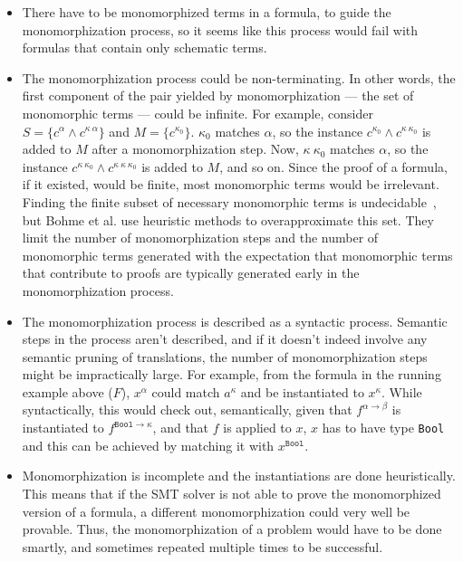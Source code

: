 \documentclass{article}
\begin{document}
	\begin{itemize}
		\item There have to be monomorphized 
		terms in a formula, to guide the 
		monomorphization process, so it 
		seems like this process would 
		fail with formulas that contain 
		only schematic terms. 
		\item The monomorphization process 
		could be non-terminating. In 
		other words, the first component
		of the pair yielded by 
		monomorphization --- the 
		set of monomorphic terms ---
		could be infinite. For example,
		consider $S = \{c^{\alpha}
		\land c^{\kappa\ \alpha}\}$
		and $M = \{c^{\kappa_0}\}$.
		$\kappa_0$ matches 
		$\alpha$, so the instance
		$c^{\kappa_0} \land 
		c^{\kappa\ \kappa_0}$ is added 
		to $M$ after a monomorphization 
		step. Now, $\kappa\ \kappa_0$
		matches $\alpha$, so the 
		instance $c^{\kappa\ \kappa_0} 
		\land c^{\kappa\ \kappa\ 
			\kappa_0}$ is added to $M$, 
		and so on. Since the proof of a 
		formula, if it existed, would 
		be finite, most monomorphic 
		terms would be irrelevant. 
		Finding the finite subset of 
		necessary monomorphic terms is 
		undecidable~\cite{10.1007/978-3-642-24364-6_7},
		but Bohme et al. use heuristic
		methods to overapproximate
		this set. They limit the 
		number of monomorphization 
		steps and the number of 
		monomorphic terms generated
		with the expectation that 
		monomorphic terms that 
		contribute to proofs 
		are typically generated early 
		in the monomorphization process.
		\item The monomorphization process
		is described as a syntactic 
		process. Semantic steps in 
		the process aren't described, 
		and if it doesn't indeed 
		involve	any semantic pruning of 
		translations, the number of 
		monomorphization steps 
		might be impractically large. 
		For example, from the formula 
		in the running example above ($F$), 
		$x^{\alpha}$ could match 
		$a^{\kappa}$ and be instantiated 
		to $x^{\kappa}$. While 
		syntactically, this would 
		check out, semantically, 
		given that $f^{\alpha \to \beta}$
		is instantiated to 
		$f^{\texttt{Bool} \to \kappa}$, 
		and that $f$ is applied to $x$, 
		$x$ has to have type 
		\texttt{Bool} and this can be 
		achieved by matching it with 
		$x^{\texttt{Bool}}$.
		\item Monomorphization is 
		incomplete and the instantiations 
		are done heuristically. This 
		means that if the SMT solver 
		is not able to prove the 
		monomorphized version of a 
		formula, a different 
		monomorphization could 
		very well be provable. Thus, 
		the monomorphization of a 
		problem would have to be 
		done smartly, and sometimes
		repeated multiple times to 
		be successful. 
	\end{itemize} 
	
\end{document}
